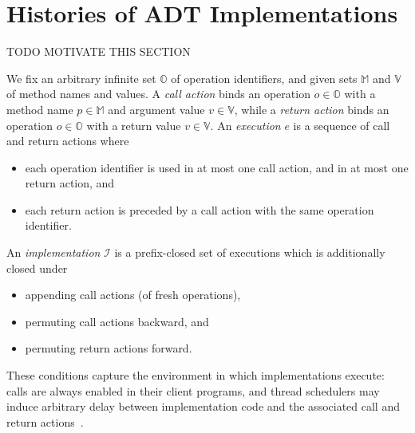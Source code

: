 \section{Histories of ADT Implementations}
\label{sec:histories}

TODO MOTIVATE THIS SECTION

We fix an arbitrary infinite set $\mathbb{O}$ of operation identifiers, and
given sets $\mathbb{M}$ and $\mathbb{V}$ of method names and values. A
\emph{call action} binds an operation $o \in \mathbb{O}$ with a method name $p
\in \mathbb{M}$ and argument value $v \in \mathbb{V}$, while a \emph{return
action} binds an operation $o \in \mathbb{O}$ with a return value $v \in
\mathbb{V}$. An \emph{execution} $e$ is a sequence of call and return actions
where
\begin{itemize}

  \item each operation identifier is used in at most one call action, and in at
  most one return action, and

  \item each return action is preceded by a call action with the same operation
  identifier.

\end{itemize}
An \emph{implementation} $\mathcal{I}$ is a prefix-closed set of executions
which is additionally closed under
\begin{itemize}

  \item appending call actions (of fresh operations),

  \item permuting call actions backward, and

  \item permuting return actions forward.

\end{itemize}
These conditions capture the environment in which implementations execute:
calls are always enabled in their client programs, and thread schedulers may
induce arbitrary delay between implementation code and the associated call and
return actions~\cite{conf/popl/BouajjaniEEH15}.

